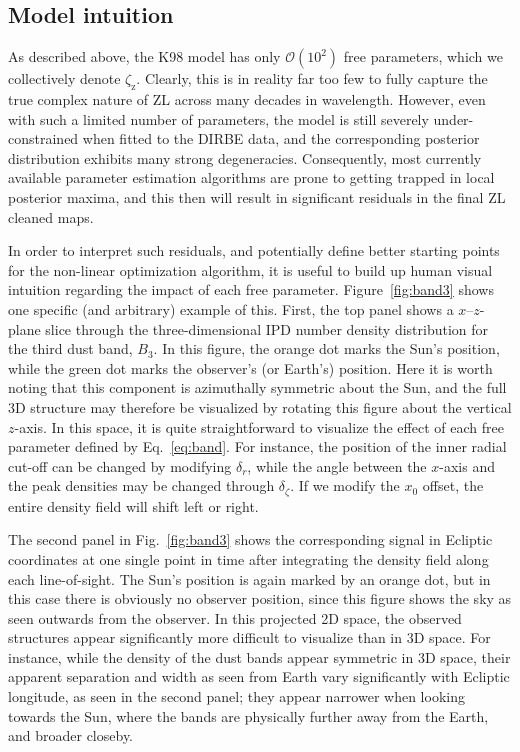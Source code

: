 \documentclass[twocolumn]{aa}
\begin{document}
\subsection{Model intuition}

As described above, the K98 model has only $\mathcal{O}(10^2)$ free
parameters, which we collectively denote
$\zeta_{\mathrm{z}}$. Clearly, this is in reality far too few to fully
capture the true complex nature of ZL across many decades in
wavelength. However, even with such a limited number of parameters,
the model is still severely under-constrained when fitted to the DIRBE
data, and the corresponding posterior distribution exhibits many
strong degeneracies. Consequently, most currently available parameter
estimation algorithms are prone to getting trapped in local posterior
maxima, and this then will result in significant residuals in the
final ZL cleaned maps.

In order to interpret such residuals, and potentially define better
starting points for the non-linear optimization algorithm, it is
useful to build up human visual intuition regarding the impact of each
free parameter. Figure~\ref{fig:band3} shows one specific (and
arbitrary) example of this. First, the top panel shows a
$x$--$z$-plane slice through the three-dimensional IPD number density
distribution for the third dust band, $B_3$. In this figure, the
orange dot marks the Sun's position, while the green dot marks the
observer's (or Earth's) position. Here it is worth noting that this
component is azimuthally symmetric about the Sun, and the full 3D
structure may therefore be visualized by rotating this figure about
the vertical $z$-axis. In this space, it is quite straightforward to
visualize the effect of each free parameter defined by
Eq.~\eqref{eq:band}. For instance, the position of the inner radial
cut-off can be changed by modifying $\delta_{r}$, while the angle
between the $x$-axis and the peak densities may be changed through
$\delta_{\zeta}$. If we modify the $x_0$ offset, the entire density
field will shift left or right.

The second panel in Fig.~\ref{fig:band3} shows the corresponding
signal in Ecliptic coordinates at one single point in time after
integrating the density field along each line-of-sight. The Sun's
position is again marked by an orange dot, but in this case there is
obviously no observer position, since this figure shows the sky as
seen outwards from the observer. In this projected 2D space, the
observed structures appear significantly more difficult to visualize
than in 3D space. For instance, while the density of the dust bands
appear symmetric in 3D space, their apparent separation and width as
seen from Earth vary significantly with Ecliptic longitude, as seen in
the second panel; they appear narrower when looking towards the Sun,
where the bands are physically further away from the Earth, and
broader closeby.
\end{document}
